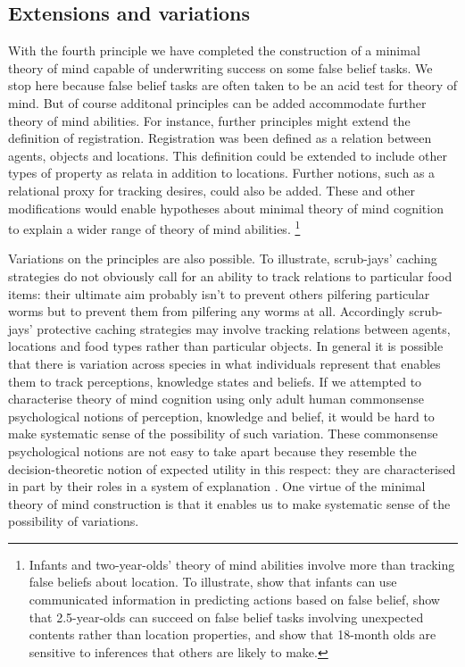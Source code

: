 \documentclass[12pt,\papersize]{extarticle}
\begin{document}
\subsection{Extensions and variations}
With the fourth principle we have completed the construction of a minimal theory of mind capable of underwriting success on some false belief tasks.  
We stop here because false belief tasks are often taken to be an acid test for theory of mind.
But of course additonal principles can be added accommodate further theory of mind abilities.  
For instance, further principles might extend the definition of registration.  
Registration was been defined as a relation between agents, objects and locations. 
This definition could be extended to include  other types of property as relata in addition to locations.  
Further notions, such as a relational proxy for tracking desires, could also be added.  
These and other modifications would enable hypotheses about minimal theory of mind cognition  to explain a wider range of theory of mind abilities.%
\footnote{
Infants and two-year-olds' theory of mind abilities involve more than tracking false beliefs about location.
To illustrate, \citet{en_1691} show that infants can use communicated information in predicting actions based on false belief, 
\citet{he:2011_false}  show that 2.5-year-olds can succeed on false belief tasks involving unexpected contents rather than location properties, 
and  \citet{en_1795}  show that 18-month olds are sensitive to inferences that others are likely to make. 
}


Variations on the principles are also possible.  To illustrate, scrub-jays’ caching strategies do not obviously call for an ability to track relations to particular food items: their ultimate aim probably isn’t to prevent others pilfering particular worms but to prevent them from pilfering any worms at all.  Accordingly scrub-jays’ protective caching strategies may involve tracking relations between agents, locations and food types rather than particular objects.  
In general it is possible that there is variation across species in what individuals represent that enables them to track perceptions, knowledge states and beliefs. 
If we attempted to characterise theory of mind cognition using only adult human commonsense psychological notions of perception, knowledge and belief, it would be hard to make systematic  sense of the possibility of such variation.
These commonsense psychological notions are not easy to take apart because they resemble the decision-theoretic notion of expected utility in this respect: they are characterised in part by their roles in a system of explanation \citep{Davidson:1985qg,Davidson:1999ju}.
One virtue of the minimal theory of mind construction is that it enables us to make systematic sense of the possibility of variations. 
\end{document}
